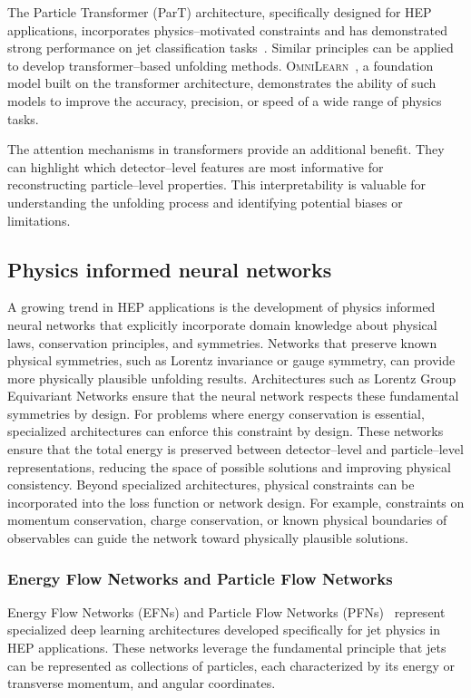     The Particle Transformer (ParT) architecture,\cite{Qu2022ParticleTagging} specifically designed for HEP applications, incorporates physics--motivated constraints and has demonstrated strong performance on jet classification tasks~\cite{Araz2025GraphLHC}.
    Similar principles can be applied to develop transformer--based unfolding methods.
    \textsc{OmniLearn}~\cite{Mikuni2025MethodTasks}, a foundation model built on the transformer architecture, demonstrates the ability of such models to improve the accuracy, precision, or speed of a wide range of physics tasks.

    The attention mechanisms in transformers provide an additional benefit.
    They can highlight which detector--level features are most informative for reconstructing particle--level properties.
    This interpretability is valuable for understanding the unfolding process and identifying potential biases or limitations.
\subsection{Physics informed neural networks}
    A growing trend in HEP applications is the development of physics informed neural networks that explicitly incorporate domain knowledge about physical laws, conservation principles, and symmetries.
    Networks that preserve known physical symmetries, such as Lorentz invariance or gauge symmetry, can provide more physically plausible unfolding results.
    Architectures such as Lorentz Group Equivariant Networks\cite{Bogatskiy2020LorentzPhysics} ensure that the neural network respects these fundamental symmetries by design.
    For problems where energy conservation is essential, specialized architectures can enforce this constraint by design.
    These networks ensure that the total energy is preserved between detector--level and particle--level representations, reducing the space of possible solutions and improving physical consistency.
    Beyond specialized architectures, physical constraints can be incorporated into the loss function or network design.
    For example, constraints on momentum conservation, charge conservation, or known physical boundaries of observables can guide the network toward physically plausible solutions.

    \subsubsection{Energy Flow Networks and Particle Flow Networks}
        Energy Flow Networks (EFNs) and Particle Flow Networks (PFNs)~\cite{Komiske2019EnergyJets} represent specialized deep learning architectures developed specifically for jet physics in HEP applications.
        These networks leverage the fundamental principle that jets can be represented as collections of particles, each characterized by its energy or transverse momentum, and angular coordinates.

